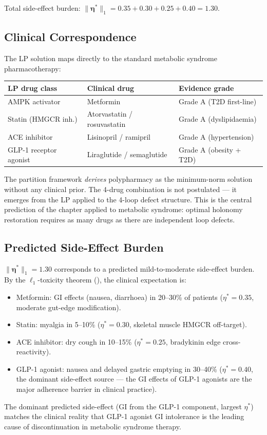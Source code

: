 Total side-effect burden: $\|\boldsymbol{\eta}^*\|_1 = 0.35 + 0.30 + 0.25
+ 0.40 = 1.30$.

\subsection{Clinical Correspondence}
\label{subsec:ch09-metsyn-clinical}

The LP solution maps directly to the standard metabolic syndrome
pharmacotherapy:
\begin{center}
\begin{tabular}{lll}
\toprule
LP drug class & Clinical drug & Evidence grade \\
\midrule
AMPK activator & Metformin & Grade A (T2D first-line) \\
Statin (HMGCR inh.) & Atorvastatin / rosuvastatin & Grade A (dyslipidaemia) \\
ACE inhibitor & Lisinopril / ramipril & Grade A (hypertension) \\
GLP-1 receptor agonist & Liraglutide / semaglutide & Grade A (obesity + T2D) \\
\bottomrule
\end{tabular}
\end{center}

The partition framework \emph{derives} polypharmacy as the minimum-norm
solution without any clinical prior.  The 4-drug combination is not
postulated --- it emerges from the LP applied to the 4-loop defect structure.
This is the central prediction of the chapter applied to metabolic syndrome:
optimal holonomy restoration requires as many drugs as there are independent
loop defects.

\subsection{Predicted Side-Effect Burden}
\label{subsec:ch09-metsyn-sideeffects}

$\|\boldsymbol{\eta}^*\|_1 = 1.30$ corresponds to a predicted mild-to-moderate
side-effect burden.  By the $\ell_1$-toxicity theorem
(), the clinical expectation is:
\begin{itemize}[leftmargin=2em]
  \item Metformin: GI effects (nausea, diarrhoea) in 20--30\% of patients
    ($\eta^* = 0.35$, moderate gut-edge modification).
  \item Statin: myalgia in 5--10\% ($\eta^* = 0.30$, skeletal muscle
    HMGCR off-target).
  \item ACE inhibitor: dry cough in 10--15\% ($\eta^* = 0.25$, bradykinin
    edge cross-reactivity).
  \item GLP-1 agonist: nausea and delayed gastric emptying in 30--40\%
    ($\eta^* = 0.40$, the dominant side-effect source --- the GI effects
    of GLP-1 agonists are the major adherence barrier in clinical practice).
\end{itemize}
The dominant predicted side-effect (GI from the GLP-1 component, largest
$\eta^*$) matches the clinical reality that GLP-1 agonist GI intolerance
is the leading cause of discontinuation in metabolic syndrome therapy.

